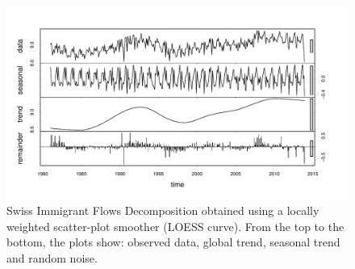 \documentclass{article}\usepackage[]{graphicx}\usepackage[]{color}
\makeatletter
\def\maxwidth{ %
  \ifdim\Gin@nat@width>\linewidth
    \linewidth
  \else
    \Gin@nat@width
  \fi
}
\newenvironment{knitrout}{}{} %
\makeatother
\begin{document}
\begin{knitrout}
\color{fgcolor}\begin{figure}[!ht]
\includegraphics[width=\maxwidth]{figure/decomposition-1} \caption[Swiss Immigrant Flows Decomposition obtained using a locally weighted scatter-plot smoother (LOESS curve)]{Swiss Immigrant Flows Decomposition obtained using a locally weighted scatter-plot smoother (LOESS curve).  From the top to the bottom, the plots show: observed data, global trend, seasonal trend and random noise. }\label{fig:decomposition}
\end{figure}


\end{knitrout}
\end{document}
